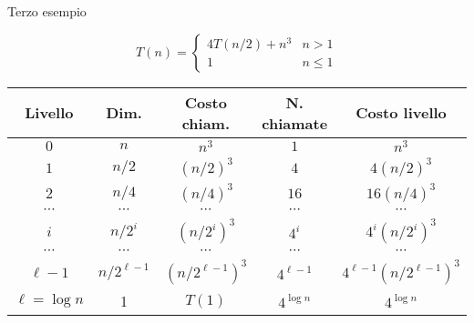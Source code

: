 \begin{frame}[noframenumbering,shrink=5]{Terzo esempio}

\vspace{-6pt}
\begin{mybox}
\[
T(n) = \left\{ 
  \begin{array}{ll}
     4T(n/2) + n^3 & n > 1 \\
     1 & n \leq 1
  \end{array} 
\right.
\]
\end{mybox}

\begin{center}
\begin{tabular}{|c|c|c|c|c|}
\hline
\textbf{Livello} & \textbf{Dim.} & \textbf{Costo chiam.} & \textbf{N. chiamate} & \textbf{Costo livello} \\\hline
$0$ & $n$   & $n^3$     & $1$  & $n^3$ \\\hline
$1$ & $n/2$ & $(n/2)^3$ & $4$  & $4(n/2)^3$\\\hline
$2$ & $n/4$ & $(n/4)^3$ & $16$ & $16(n/4)^3$\\\hline
$\cdots$ & $\cdots$ & $\cdots$ & $\cdots$ & $\cdots$ \\\hline
$i$ & $n/2^i$ & $(n/2^i)^3$ & $4^i$ & $4^i (n/2^i)^3$ \\\hline
$\cdots$ & $\cdots$ & $\cdots$ & $\cdots$ & $\cdots$ \\\hline
${\ell-1}$ & $n/2^{\ell-1}$ & $(n/2^{\ell-1})^3$ & $4^{\ell-1}$ & $4^{\ell-1} (n/2^{\ell-1})^3$ \\\hline
$\ell = \log n$ & 1 & $T(1)$ & $4^{\log n}$ & $4^{\log n}$ \\\hline
\end{tabular}
\end{center}

\end{frame}

